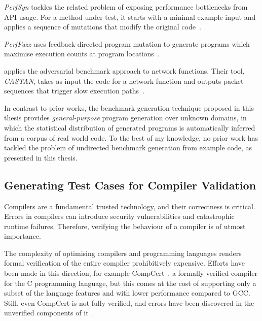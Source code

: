 \emph{PerfSyn} tackles the related problem of exposing performance bottlenecks from API usage. For a method under test, it starts with a minimal example input and applies a sequence of mutations that modify the original code~\cite{Toffola2018}.

\emph{PerfFuzz} uses feedback-directed program mutation to generate programs which maximise execution counts at program locations~\cite{Lemieux2018}.

\citeauthor{Pedrosa2018} applies the adversarial benchmark approach to network functions. Their tool, \emph{CASTAN}, takes as input the code for a network function and outputs packet sequences that trigger slow execution paths~\cite{Pedrosa2018}.


In contrast to prior works, the benchmark generation technique proposed in this thesis provides \emph{general-purpose} program generation over unknown domains, in which the statistical distribution of generated programs is automatically inferred from a corpus of real world code. To the best of my knowledge, no prior work has tackled the problem of undirected benchmark generation from example code, as presented in this thesis.


\subsection{Generating Test Cases for Compiler Validation}

Compilers are a fundamental trusted technology, and their correctness is critical. Errors in compilers can introduce security vulnerabilities and catastrophic runtime failures. Therefore, verifying the behaviour of a compiler is of utmost importance.

The complexity of optimising compilers and programming languages renders formal verification of the entire compiler prohibitively expensive. Efforts have been made in this direction, for example CompCert~\cite{Leroy2013}, a formally verified compiler for the C programming language, but this comes at the cost of supporting only a subset of the language features and with lower performance compared to GCC. Still, even CompCert is not fully verified, and errors have been discovered in the unverified components of it~\cite{Yang2011}.

